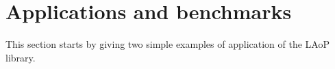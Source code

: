 \documentclass[sigplan]{acmart}\settopmatter{}
\def\start{&&}
\def\more{\\&&}
\begin{document}
\section{Applications and benchmarks}\label{sec-appl}
This section starts by giving two simple examples of application of the LAoP library.

%
%
%
%
\end{document}
